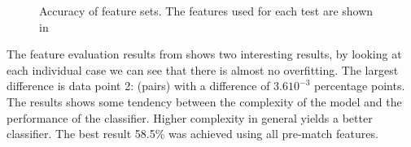 \begin{figure}[!htb]
  \centering
   \caption{Accuracy of feature sets. The features used for each test are shown in }\label{fig:cluster-feat}
\end{figure}

The feature evaluation results from  shows two interesting results, by looking at each individual case we can see that there is almost no overfitting. The largest difference is data point 2: (pairs) with a difference of $3.610^{-3}$ percentage points. The results shows some tendency between the complexity of the model and the performance of the classifier. Higher complexity in general yields a better classifier. The best result 58.5\% was achieved using all pre-match features.

